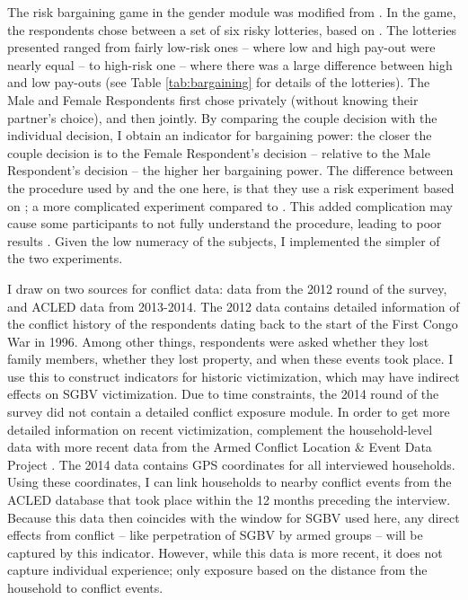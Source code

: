 The risk bargaining game in the gender module was modified from \cite{Martinsson2009}. In the game, the respondents chose between a set of six risky lotteries, based on \cite{Eckel2002}. The lotteries presented ranged from fairly low-risk ones -- where low and high pay-out were nearly equal -- to high-risk one -- where there was a large difference between high and low pay-outs (see Table \ref{tab:bargaining} for details of the lotteries). The Male and Female Respondents first chose privately (without knowing their partner's choice), and then jointly. By comparing the couple decision with the individual decision, I obtain an indicator for bargaining power: the closer the couple decision is to the Female Respondent's decision -- relative to the Male Respondent's decision -- the higher her bargaining power. The difference between the procedure used by \cite{Martinsson2009} and the one here, is that they use a risk experiment based on \cite{Holt2002}; a more complicated experiment compared to \citeauthor{Eckel2002}. This added complication may cause some participants to not fully understand the procedure, leading to poor results \citep{Dave2010a}. Given the low numeracy of the subjects, I implemented the simpler of the two experiments.

I draw on two sources for conflict data: data from the 2012 round of the survey, and ACLED data from 2013-2014. The 2012 data contains detailed information of the conflict history of the respondents dating back to the start of the First Congo War in 1996. Among other things, respondents were asked whether they lost family members, whether they lost property, and when these events took place. I use this to construct indicators for historic victimization, which may have indirect effects on SGBV victimization.  Due to time constraints, the 2014 round of the survey did not contain a detailed conflict exposure module. In order to get more detailed information on recent victimization, complement the household-level data with more recent data from the Armed Conflict Location \& Event Data Project \citep[ACLED;][]{Raleigh2010}. The 2014 data contains GPS coordinates for all interviewed households. Using these coordinates, I can link households to nearby conflict events from the ACLED database that took place within the 12 months preceding the interview. Because this data then coincides with the window for SGBV used here, any direct effects from conflict -- like perpetration of SGBV by armed groups -- will be captured by this indicator. However, while this data is more recent, it does not capture individual experience; only exposure based on the distance from the household to conflict events. 



